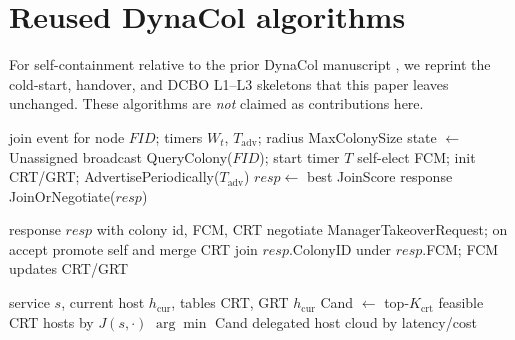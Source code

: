 \documentclass[pdflatex,sn-mathphys-num,iicol]{sn-jnl}
\begin{document}
\appendix
\section{Reused DynaCol algorithms}
\label{app:dynacol}

For self-containment relative to the prior DynaCol manuscript
\cite{nabati_dynacol_cluster2026}, we reprint the cold-start, handover, and
DCBO L1--L3 skeletons that this paper leaves unchanged. These algorithms are
\emph{not} claimed as contributions here.

\begin{algorithm}[H]
\caption{Cold-start join (Create\_And\_Add\_FogNode)}
\label{alg:cold}
\begin{algorithmic}[1]
\Require join event for node $FID$; timers $W_t$, $T_{\mathrm{adv}}$; radius MaxColonySize
\State state $\leftarrow$ Unassigned
\State broadcast QueryColony($FID$); start timer $T$
  \State self-elect FCM; init CRT/GRT; AdvertisePeriodically($T_{\mathrm{adv}}$)
\Else
  \State $resp\leftarrow$ best JoinScore response
    \State JoinOrNegotiate($resp$) 
  \EndIf
\EndIf
\end{algorithmic}
\end{algorithm}

\begin{algorithm}[H]
\caption{JoinOrNegotiate (potency-based FCM handover)}
\label{alg:handover}
\begin{algorithmic}[1]
\Require response $resp$ with colony id, FCM, CRT
  \State negotiate ManagerTakeoverRequest; on accept promote self and merge CRT
\Else
  \State join $resp$.ColonyID under $resp$.FCM; FCM updates CRT/GRT
\EndIf
\end{algorithmic}
\end{algorithm}

\begin{algorithm}[H]
\caption{DCBO\_PlaceService (L1--L3)}
\label{alg:dcbo}
\begin{algorithmic}[1]
\Require service $s$, current host $h_{\mathrm{cur}}$, tables CRT, GRT
  \State \Return $h_{\mathrm{cur}}$ 
\EndIf
\State Cand $\leftarrow$ top-$K_{\mathrm{crt}}$ feasible CRT hosts by $J(s,\cdot)$
  \State \Return $\arg\min$ Cand 
\EndIf
{}
    \State \Return delegated host 
  \EndIf
\EndFor
\State \Return cloud by latency/cost 
\end{algorithmic}
\end{algorithm}
\end{document}
